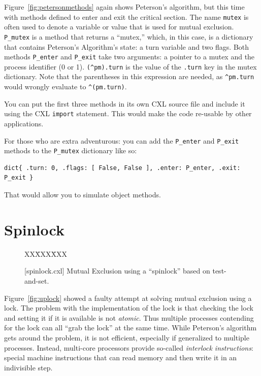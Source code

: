\documentclass{report}
\newcommand{\cxlsource}[1]{
\begin{tabbing}
XX\=XXX\=XXX\kill
    
\end{tabbing}
}
\newenvironment{code}{
\tcolorbox
}{
\endtcolorbox
}
\begin{document}
Figure~\ref{fig:petersonmethods} again shows Peterson's algorithm,
but this time with methods defined to enter and exit the critical
section.
The name \texttt{mutex} is often used to denote a variable or value
that is used for mutual exclusion.
\texttt{P\_mutex} is a method that returns a ``mutex,'' which, in this
case, is a dictionary that contains Peterson's Algorithm's state:
a turn variable and two flags.
Both methods \texttt{P\_enter} and \texttt{P\_exit} take two arguments:
a pointer to a mutex and the process identifier (0 or 1).
\texttt{(\^{}pm).turn} is the value of the \texttt{.turn} key
in the mutex dictionary.  Note that the parentheses in this expression
are needed, as \texttt{\^{}pm.turn} would wrongly evaluate to
\texttt{\^{}(pm.turn)}.

You can put the first three methods in its own CXL source file
and include it using the CXL \texttt{import} statement.
This would
make the code re-usable by other applications.

For those who are
extra adventurous: you can add the \texttt{P\_enter} and
\texttt{P\_exit} methods to the \texttt{P\_mutex} dictionary
like so:
\begin{code}
\begin{verbatim}
dict{ .turn: 0, .flags: [ False, False ], .enter: P_enter, .exit: P_exit }
\end{verbatim}
\end{code}
That would allow you to simulate object methods.

\chapter{Spinlock}
\label{ch:spinlock}


\begin{figure}
\begin{code}
\cxlsource{spinlock}
\end{code}
\caption{[spinlock.cxl] Mutual Exclusion using a ``spinlock'' based on test-and-set.}
\label{fig:tas}
\end{figure}

Figure~\ref{fig:uplock} showed a faulty attempt at solving mutual
exclusion using a lock.  The problem with the implementation of the
lock is that checking the lock and setting it if it is available is
not \emph{atomic}.  Thus multiple processes contending for the lock
can all ``grab the lock'' at the same time.  While Peterson's
algorithm gets around the problem, it is not efficient, especially
if generalized to multiple processes.  Instead, multi-core processors provide
so-called \emph{interlock instructions}:
special machine instructions
that can read memory and then write it in an indivisible step.
\end{document}
